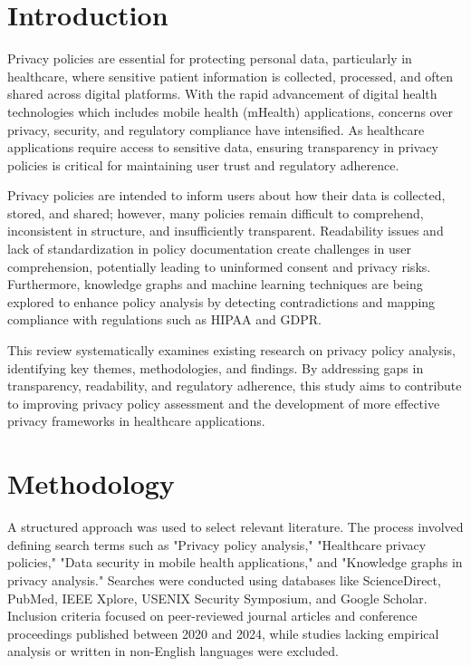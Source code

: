 \documentclass[conference]{IEEEtran}
\begin{document}
\section{Introduction}
 Privacy policies are essential for protecting personal data, particularly in healthcare, where sensitive patient information is collected, processed, and often shared across digital platforms. With the rapid advancement of digital health technologies which includes mobile health (mHealth) applications, concerns over privacy, security, and regulatory compliance have intensified. As healthcare applications require access to sensitive data, ensuring transparency in privacy policies is critical for maintaining user trust and regulatory adherence.

Privacy policies are intended to inform users about how their data is collected, stored, and shared; however, many policies remain difficult to comprehend, inconsistent in structure, and insufficiently transparent. Readability issues and lack of standardization in policy documentation create challenges in user comprehension, potentially leading to uninformed consent and privacy risks. Furthermore, knowledge graphs and machine learning techniques are being explored to enhance policy analysis by detecting contradictions and mapping compliance with regulations such as HIPAA and GDPR.

This review systematically examines existing research on privacy policy analysis, identifying key themes, methodologies, and findings. By addressing gaps in transparency, readability, and regulatory adherence, this study aims to contribute to improving privacy policy assessment and the development of more effective privacy frameworks in healthcare applications.


\section{Methodology}

A structured approach was used to select relevant literature. The process involved defining search terms such as "Privacy policy analysis," "Healthcare privacy policies," "Data security in mobile health applications," and "Knowledge graphs in privacy analysis." Searches were conducted using databases like ScienceDirect, PubMed, IEEE Xplore, USENIX Security Symposium, and Google Scholar. Inclusion criteria focused on peer-reviewed journal articles and conference proceedings published between 2020 and 2024, while studies lacking empirical analysis or written in non-English languages were excluded.
\end{document}
